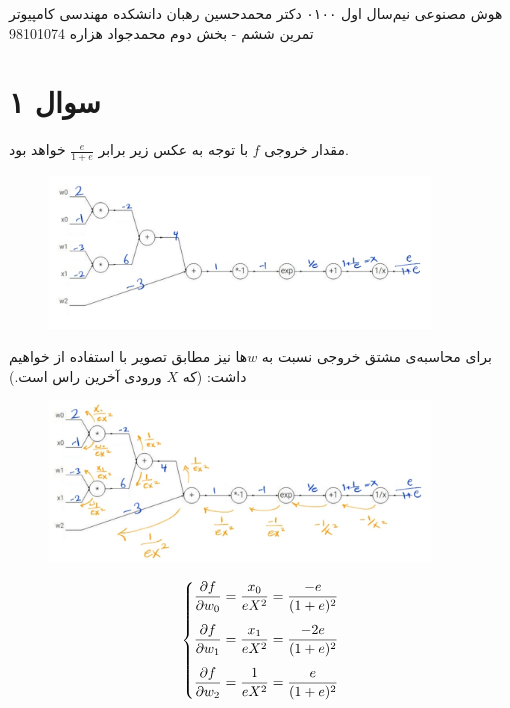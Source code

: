 \documentclass[a4paper, 12pt]{article}
\begin{document}
\handout
{هوش مصنوعی}
{نیم‌سال اول ۰۱\lr{-}۰۰}
{دکتر محمدحسین رهبان}
{دانشکده مهندسی کامپیوتر}
{تمرین ششم - بخش دوم}
{محمدجواد هزاره}
{98101074}
\noindent
\\[-6em]
\section*{سوال ۱}
مقدار خروجی $f$ با توجه به عکس زیر برابر
$\frac{e}{1+e}$
خواهد بود.
\begin{figure}[H]
	\centering
	\includegraphics[width=0.9\textwidth]{forward.jpg}
\end{figure}
\noindent
برای محاسبه‌ی مشتق خروجی نسبت به $w$ها نیز مطابق تصویر با استفاده از
خواهیم داشت: (که $X$ ورودی آخرین راس است.)
\begin{figure}[H]
	\centering
	\includegraphics[width=0.9\textwidth]{backpropagation.jpg}
\end{figure}
\[
\begin{dcases}
	\frac{\partial f}{\partial w_0} = \frac{x_0}{eX^2} = \frac{-e}{(1+e)^2} \\[0.4em]
	\frac{\partial f}{\partial w_1} = \frac{x_1}{eX^2} = \frac{-2e}{(1+e)^2} \\[0.4em]
	\frac{\partial f}{\partial w_2} = \frac{1}{eX^2} = \frac{e}{(1+e)^2}
\end{dcases}
\]
\end{document}
